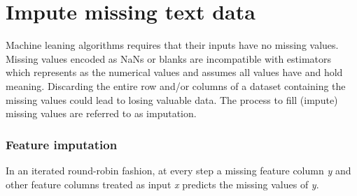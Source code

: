 \chapter{Impute missing text data}

Machine leaning algorithms requires that their inputs have no missing values.
Missing values encoded as NaNs or blanks are incompatible with estimators which represents as the numerical values and assumes all values have and hold meaning. Discarding the entire row and/or columns of a dataset containing the missing values could lead to losing valuable data. The process to fill (impute) missing values are referred to as imputation.

\subsection{Feature imputation}

In an iterated round-robin fashion, at every step a missing feature column  \textit{y} and other feature columns treated as input \textit{x} predicts the missing values of \textit{y}. 
